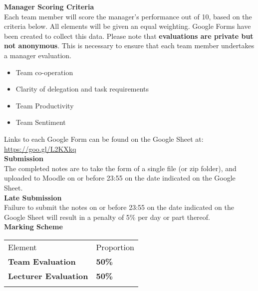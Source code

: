 \textbf{Manager Scoring Criteria}\\

Each team member will score the manager's performance out of 10, based on the criteria below.  All elements will be given an equal weighting.  Google Forms have been created to collect this data.  Please note that \textbf{evaluations are private but not anonymous}.  This is necessary to ensure that each team member undertakes a manager evaluation.

\begin{itemize}
	\item Team co-operation
	\item Clarity of delegation and task requirements
	\item Team Productivity
	\item Team Sentiment
\end{itemize}

Links to each Google Form can be found on the Google Sheet at: \href{https://goo.gl/L2KXkq}{https://goo.gl/L2KXkq}\\  


\textbf{Submission}\\

The completed notes are to take the form of a single file (or zip folder), and uploaded to Moodle on or before 23:55 on the date indicated on the Google Sheet.\\


\textbf{Late Submission}\\

Failure to submit the notes on or before 23:55 on the date indicated on the Google Sheet will result in a penalty of 5\% per day or part thereof.\\

\vspace{0.5cm}
\textbf{Marking Scheme}\\

\begin{table}[h!]
     \begin{center}
     \begin{tabular}{p{7cm}  p{3cm} }
     \toprule
      \textbf\large{Element} & \textbf\large{Proportion} \\ 
    \cmidrule(r){1-1}\cmidrule(lr){2-2}
      \textbf{Team Evaluation} & \textbf{50\%}\\
      \textbf{Lecturer Evaluation} & \textbf{50\%}\\    
      \\ \bottomrule
      \end{tabular}
      \label{tbl:markSchemeAsmt3}
      \end{center}
 \end{table}

